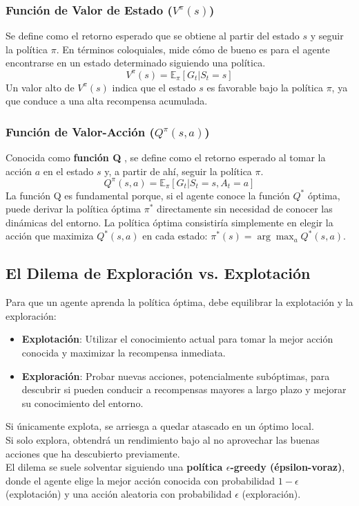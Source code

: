 \documentclass[12pt,a4paper]{book}
\begin{document}
\subsubsection{Función de Valor de Estado ($V^{\pi}(s)$)}
Se define como el retorno esperado que se obtiene al partir del estado $s$ y seguir la política $\pi$. En términos coloquiales, mide cómo de bueno es para el agente encontrarse en un estado determinado siguiendo una política.
\[ V^{\pi}(s) = \mathbb{E}_{\pi}[G_t | S_t = s] \]
Un valor alto de $V^{\pi}(s)$ indica que el estado $s$ es favorable bajo la política $\pi$, ya que conduce a una alta recompensa acumulada.

\subsubsection{Función de Valor-Acción ($Q^{\pi}(s, a)$)}
Conocida como \textbf{función Q} \cite{q-learning}, se define como el retorno esperado al tomar la acción $a$ en el estado $s$ y, a partir de ahí, seguir la política $\pi$.
\[ Q^{\pi}(s, a) = \mathbb{E}_{\pi}[G_t | S_t = s, A_t = a] \]
La función Q es fundamental porque, si el agente conoce la función $Q^*$ óptima, puede derivar la política óptima $\pi^*$ directamente sin necesidad de conocer las dinámicas del entorno. La política óptima consistiría simplemente en elegir la acción que maximiza $Q^*(s, a)$ en cada estado: $\pi^*(s) = \arg\max_a Q^*(s, a)$.

\subsection{El Dilema de Exploración vs. Explotación}

Para que un agente aprenda la política óptima, debe equilibrar la explotación y la exploración:
\begin{itemize}
    \item \textbf{Explotación}: Utilizar el conocimiento actual para tomar la mejor acción conocida y maximizar la recompensa inmediata.
    \item \textbf{Exploración}: Probar nuevas acciones, potencialmente subóptimas, para descubrir si pueden conducir a recompensas mayores a largo plazo y mejorar su conocimiento del entorno.
\end{itemize}
Si únicamente explota, se arriesga a quedar atascado en un óptimo local.\\
Si solo explora, obtendrá un rendimiento bajo al no aprovechar las buenas acciones que ha descubierto previamente.\\
El dilema se suele solventar siguiendo una \textbf{política $\epsilon$-greedy (épsilon-voraz)}, donde el agente elige la mejor acción conocida con probabilidad $1-\epsilon$ (explotación) y una acción aleatoria con probabilidad $\epsilon$ (exploración).
\end{document}
